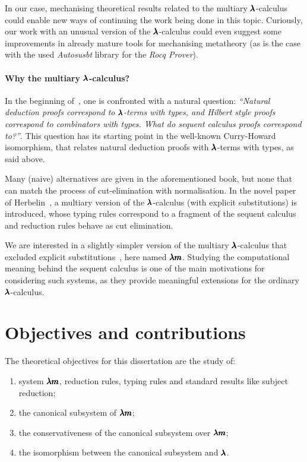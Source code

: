 In our case, mechanising theoretical results related to the multiary $\pmb{\lambda}$-calculus could enable new ways of continuing the work being done in this topic.
Curiously, our work with an unusual version of the $\pmb{\lambda}$-calculus could even suggest some improvements in already mature tools for mechanising metatheory (as is the case with the used \textit{Autosusbt} library for the \textit{Rocq Prover}).

\paragraph{Why the multiary $\pmb{\lambda}$-calculus?}
In the beginning of~\cite[Chapter~7.3]{CurryHoward}, one is confronted with a natural question: \textit{``Natural deduction proofs correspond to $\pmb{\lambda}$-terms with types, and Hilbert style proofs correspond to combinators with types. What do sequent calculus proofs correspond to?''}.
This question has its starting point in the well-known Curry-Howard isomorphism, that relates natural deduction proofs with $\pmb{\lambda}$-terms with types, as said above.

Many (naive) alternatives are given in the aforementioned book, but none that can match the process of cut-elimination with normalisation.
In the novel paper of Herbelin~\cite{Herbelin1994}, a multiary version of the $\pmb{\lambda}$-calculus (with explicit substitutions) is introduced, whose typing rules correspond to a fragment of the sequent calculus and reduction rules behave as cut elimination.

We are interested in a slightly simpler version of the multiary $\pmb{\lambda}$-calculus that excluded explicit substitutions~\cite{JCES2002, JCESLuis}, here named $\pmb{\lambda m}$.
Studying the computational meaning behind the sequent calculus is one of the main motivations for considering such systems, as they provide meaningful extensions for the ordinary $\pmb{\lambda}$-calculus.

\section{Objectives and contributions}
The theoretical objectives for this dissertation are the study of:
\begin{enumerate}
\item system $\pmb{\lambda m}$, reduction rules, typing rules and standard results like subject reduction;
\item the canonical subsystem of $\pmb{\lambda m}$;
\item the conservativeness of the canonical subsystem over $\pmb{\lambda m}$;
\item the isomorphism between the canonical subsystem and $\pmb{\lambda}$.
\end{enumerate}

